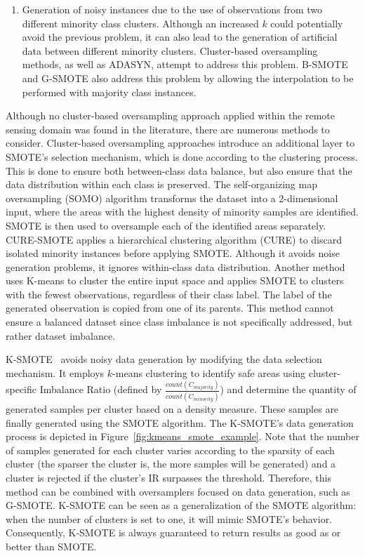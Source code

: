 \documentclass[parskip=full]{scrartcl}
\begin{document}
\begin{enumerate}
	\item Generation of noisy instances due to the use of observations from two different
	      minority class clusters. Although an increased $k$ could
	      potentially avoid the previous problem, it can also lead to the generation of
	      artificial data between different minority clusters. Cluster-based oversampling
	      methods, as well as ADASYN, attempt to address this problem. B-SMOTE
	      \cite{Han2005} and G-SMOTE also address this problem by allowing the
	      interpolation to be performed with majority class instances.
\end{enumerate}

Although no cluster-based oversampling approach applied within the remote sensing domain was found
in the literature, there are numerous methods to consider. Cluster-based oversampling approaches
introduce an additional layer to SMOTE's selection mechanism, which is done according to the
clustering process. This is done to ensure both between-class data balance, but also ensure that the
data distribution within each class is preserved. The self-organizing map oversampling (SOMO)
\cite{Douzas2017} algorithm transforms the dataset into a 2-dimensional input, where the areas with
the highest density of minority samples are identified. SMOTE is then used to oversample each of the
identified areas separately. CURE-SMOTE \cite{Ma2017} applies a hierarchical clustering algorithm
(CURE) to discard isolated minority instances before applying SMOTE. Although it avoids noise
generation problems, it ignores within-class data distribution. Another method \cite{Santos2015}
uses K-means to cluster the entire input space and applies SMOTE to clusters with the fewest
observations, regardless of their class label. The label of the generated observation is copied from
one of its parents. This method cannot ensure a balanced dataset since class imbalance is not
specifically addressed, but rather dataset imbalance.

K-SMOTE~\cite{Douzas2018} avoids noisy data generation by modifying the data selection mechanism. It
employs $k$-means clustering to identify safe areas using cluster-specific Imbalance Ratio (defined
by $\frac{count(C_{majority})}{count(C_{minority})}$) and determine the quantity of generated
samples per cluster based on a density measure. These samples are finally generated using the SMOTE
algorithm. The K-SMOTE's data generation process is depicted in
Figure~\ref{fig:kmeans_smote_example}. Note that the number of samples generated for each cluster
varies according to the sparsity of each cluster (the sparser the cluster is, the more samples will
be generated) and a cluster is rejected if the cluster's IR surpasses the threshold. Therefore, this
method can be combined with oversamplers focused on data generation, such as G-SMOTE. K-SMOTE can be
seen as a generalization of the SMOTE algorithm: when the number of clusters is set to one, it will
mimic SMOTE's behavior. Consequently, K-SMOTE is always guaranteed to return results as good as or
better than SMOTE.
\end{document}
